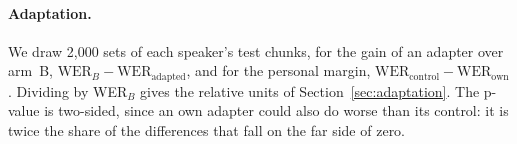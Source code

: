 \documentclass[11pt]{article}
\begin{document}
\paragraph{Adaptation.}
We draw 2{,}000 sets of each speaker's test chunks, for the gain of an adapter
over arm~B, $\text{WER}_B-\text{WER}_\text{adapted}$, and for the personal margin,
$\text{WER}_\text{control}-\text{WER}_\text{own}$. Dividing by WER$_B$ gives the
relative units of Section~\ref{sec:adaptation}. The p-value is two-sided, since an
own adapter could also do worse than its control: it is twice the share of the
differences that fall on the far side of zero.
\end{document}
